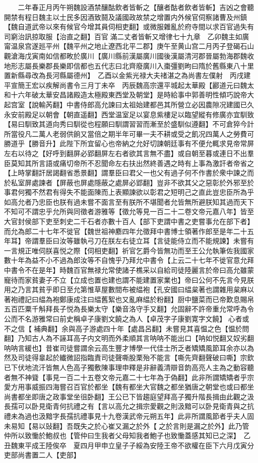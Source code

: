 　　二年春正月丙午朔魏設酒禁釀酤飲者皆斬之【釀者酤者飲者皆斬】吉凶之會聽開禁有程日魏主以士民多因酒致鬪及議國政故禁之增置内外候官伺察諸曹及州鎮【魏自道武帝以來有候官今增其員伺相吏翻】或微服雜亂於府寺間以求百官過失有司窮治訊掠取服【治直之翻】百官滿二丈者皆斬又增律七十九章　乙卯魏主如廣甯温泉宫遂廵平州【魏平州之地止遼西北平二郡】庚午至黄山宫二月丙子登碣石山觀滄海戊寅南如信都畋於廣川【廣川縣前漢屬廣川國後漢屬清河郡晉屬勃海郡魏收地形志屬長樂郡長樂即信都也五代志曰北齊廢廣川入棗彊劉昫曰隋於舊縣東八十里置新縣尋改為長河縣屬德州】　乙酉以金紫光禄大夫禇湛之為尚書左僕射　丙戌建平宣簡王宏以疾解尚書令三月丁未卒　丙辰魏高宗還平城起太華殿【酈道元曰魏太和十六年破太華安昌諸殿造太極殿東西堂及朝堂】是時給事中郭善明性傾巧說帝大起宫室【說輸芮翻】中書侍郎高允諫曰太祖始建都邑其所營立必因農隙况建國已久永安前殿足以朝會【朝直遥翻】西堂温室足以宴息紫樓足以臨望縱有修廣亦宜馴致【易曰馴致其道向秀曰馴從也程願曰馴謂習習而漸至於盛馴似遵翻】不可倉猝今計所當役凡二萬人老弱供餉又當倍之期半年可畢一夫不耕或受之飢况四萬人之勞費可勝道乎【勝音升】此陛下所宜留心也帝納之允好切諫朝廷事有不便允輒求見帝常屏左右以待之【好呼到翻屏必郢翻屏左右者欲其言無不盡】或自朝至暮或連日不出羣臣莫知其所言語或痛切帝所不忍聞命左右扶出然終善遇之時有上事為激訐者帝省之【上時掌翻訐居謁翻省悉景翻】謂羣臣曰君父一也父有過子何不作書於衆中諫之而於私室屏處諫者【屏蔽也屏處隱蔽之處屏必郢翻】豈非不欲其父之惡彰於外邪至於事君何獨不然君有得失不能面陳而上表顯諫欲以彰君之短明己之直此豈忠臣所為乎如高允者乃忠臣也朕有過未嘗不面言至有朕所不堪聞者允皆無所避朕知其過而天下不知可不謂忠乎允所與同徵者游雅等【徵允等見一百二十二卷文帝元嘉八年】皆至大官封侯部下吏至刺史二千石者亦數十百人【部下吏謂中書之吏嘗事允在部下者】而允為郎二十七年不徙官【魏世祖神䴥四年允徵拜中書博士領著作郎至是年二十五年耳】帝謂羣臣曰汝等雖執弓刀在朕左右徒立耳【言徒能侍立而不能規諫】未嘗有一言規正唯伺朕喜悦之際【伺相吏翻】祈官乞爵今皆無功而至王公允執筆佐我國家數十年為益不小不過為郎汝等不自愧乎乃拜允中書令【上云二十七年不徙官意允拜中書令不在是年】時魏百官無禄允常使諸子樵采以自給司徒陸麗言於帝曰高允雖蒙寵待而家貧妻子不立【立成也置也建也謂不能建置家業也】帝曰公何不先言今見朕用之乃言其貧乎即日至允第惟草屋數間布被緼袍【孔安國曰緼枲著也謂雜用枲麻以著袍禮記曰緼為袍鄭康成注曰緼舊絮也又亂麻緼於粉翻】厨中鹽菜而已帝歎息賜帛五百匹粟千斛拜長子悦為長樂太守【樂音洛守手又翻】允固辭不許帝重允常呼為令公而不名游雅常曰前史稱卓子康劉文饒之為人【卓茂字子康劉寛字文饒】心者或不之信【補典翻】余與高子游處四十年【處昌呂翻】未嘗見其喜愠之色【愠於問翻】乃知古人為不誣耳高子内文明而外柔順其言呐呐不能出口【呐如悦翻又奴劣翻呐呐言緩也】昔崔司徒嘗謂余云高生豐才博學一代佳士所乏者矯矯風節耳余亦以為然及司徒得辠起於纎微詔指臨責司徒聲嘶股栗殆不能言【嘶先齊翻聲破曰嘶】宗欽已下伏地流汗皆無人色高子獨敷陳事理申釋是非辭義清辯音韵高亮人主為之動容聽者無不神聳【事見一百二十五卷文帝元嘉二十七年為于偽翻】此非所謂矯矯者乎宗愛方用事威振四海嘗召百官於都坐【魏有都坐大官魏之都坐猶唐之朝堂也或曰都坐尚書都坐即唐之政事堂坐徂卧翻】王公已下皆趨庭望拜高子獨升階長揖由此觀之汲長孺可以卧見衛青何抗禮之有【言以高允之揖宗愛觀之則汲黯可以卧見衛青與之抗禮未為過也汲黯字長孺抗禮事見十九卷漢武帝元朔五年】此非所謂風節者乎夫人固未易知【易以䜴翻】吾既失之於心崔又漏之於外【之於言則是漏之於外】此乃管仲所以致慟於鮑叔也【管仲曰生我者父母知我者鮑子也致慟蓋感其知已之深】　乙丑魏東平成王陸俟卒　夏四月甲申立皇子子綏為安陸王帝不欲權在臣下六月戊寅分吏部尚書置二人【吏部】

